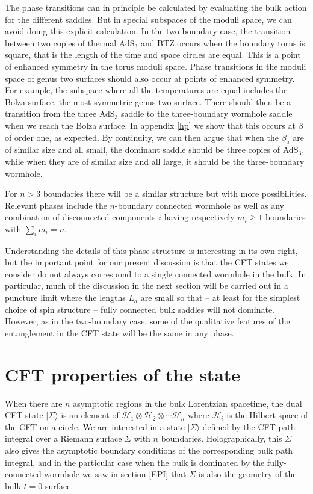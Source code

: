 \documentclass[12pt]{article}
\numberwithin{equation}{section}
\begin{document}
The phase transitions can in principle be calculated by evaluating the bulk action for the different saddles. But in special subspaces of the moduli space, we can avoid doing this explicit calculation. In the two-boundary case, the transition between two copies of thermal AdS$_3$ and BTZ occurs when the boundary torus is square, that is the length of the time and space circles are equal. This is a point of enhanced symmetry in the torus moduli space. Phase transitions in the moduli space of genus two surfaces should also occur at points of enhanced symmetry.  For example, the subspace where all the temperatures are equal includes the Bolza surface, the most symmetric genus two surface. There should then be a transition from the three AdS$_3$ saddle to the three-boundary wormhole saddle when we reach the Bolza surface. In appendix \ref{hp} we show that this occurs at $\beta$ of order one, as expected. By continuity, we can then argue that when the $\beta_a$ are of similar size and all small, the dominant saddle should be three copies of AdS$_3$, while when they are of similar size and all large, it should be the three-boundary wormhole.

For $n > 3$ boundaries there will be a similar structure but with more possibilities. Relevant phases include the $n$-boundary connected wormhole as well as any combination of disconnected components $i$ having respectively $m_i \ge 1$ boundaries with $\sum_i m_i = n$.

Understanding the details of this phase structure is interesting in its own right, but the important point for our present discussion is that the CFT states we consider do not always correspond to a single connected wormhole in the bulk. In particular, much of the discussion in the next section will be carried out in a puncture limit where the lengths $L_a$ are small so that -- at least for the simplest choice of spin structure -- fully connected bulk saddles will not dominate.  However, as in the two-boundary case, some of the qualitative features of the entanglement in the CFT state will be the same in any phase.




%
\section{CFT properties of the state}
\label{cft}
%

When there are $n$ asymptotic regions in the bulk Lorentzian spacetime, the dual CFT state $|\Sigma\rangle$ is an element of $\mathcal{H}_1 \otimes \mathcal{H}_2 \otimes \cdots \mathcal{H}_n$ where $\mathcal{H}_i$ is the Hilbert space of the CFT on a circle.    We are interested in a state $|\Sigma\rangle$ defined by the CFT path integral over a Riemann surface $\Sigma$ with $n$ boundaries. Holographically, this $\Sigma$ also gives the asymptotic boundary conditions of the corresponding bulk path integral, and in the particular case when the bulk is dominated by the fully-connected  wormhole we saw in section \ref{EPI} that $\Sigma$ is also the geometry of the bulk $t=0$ surface.
\end{document}
